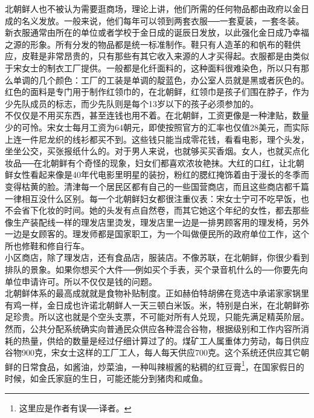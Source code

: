 北朝鲜人也不被认为需要逛商场，理论上讲，他们所需的任何物品都由政府以金日成的名义发放。一般来说，他们每年可以领到两套衣服──一套夏装，一套冬装。新衣服通常由所在的单位或者学校于金日成的诞辰日发放，以此强化金日成乃幸福之源的形象。所有分发的物品都是统一标准制作。鞋只有人造革的和帆布的鞋供应，皮鞋是非常昂贵的，只有那些有其它收入来源的人才买得起。衣服都是由类似于宋女士的制衣工厂提供。一般都是化纤面料的，这种面料很难染色，所以只有那么单调的几个颜色：工厂的工装是单调的靛蓝色，办公室人员就是黑或者灰色的。红色的面料是专门用于制作红领巾的，在北朝鲜，红领巾是孩子们围在脖子，作为少先队成员的标志，而少先队则是每个13岁以下的孩子必须参加的。\\

不仅仅是不用买东西，甚至连钱也用不着。在北朝鲜，工资更像是一种津贴，数量少的可怜。宋女士每月工资为64朝元，即使按照官方的汇率也仅值28美元，而实际上连一件尼龙织的线衫都买不到。这些钱只能当成零花钱，看看电影，理个头发，坐坐公交，买张报纸什么的。对于男人来说，也就够买买香烟。女人，也就买点化妆品──在北朝鲜有个奇怪的现象，妇女们都喜欢浓妆艳抹。大红的口红，让北朝鲜女性看起来像是40年代电影里明星的装扮，粉红的腮红掩饰着由于漫长的冬季而变得枯黄的脸。清津每一个居民区都有自己的一些国营商店，而且这些商店都千篇一律相互没什么区别。每一个北朝鲜妇女都很注重仪表：宋女士宁可不吃早饭，也不会省下化妆的时间。她的头发有点自然卷，而其它她这个年纪的女性，都去那些像生产装配线一样的理发店里烫发，理发店里一边是一排男顾客用的理发椅，另外一边是女顾客的。理发师都是国家职工，为一个叫做便民所的政府单位工作，这个所也修鞋和修自行车。\\

小区商店，除了理发店，还有食品店，服装店。不像苏联，在北朝鲜，你很少看到排队的景象。如果你想买个大件──例如买个手表，买个录音机什么的──你要先向单位申请许可。所以不仅仅是钱的问题。\\

北朝鲜体系的最高成就就是食物补贴制度。正如赫伯特胡佛在竞选中承诺家家锅里有鸡一样，金日成也许诺北朝鲜人一天三顿白米饭。米，特别是白米，在北朝鲜弥足珍贵。所以这也就是个空头支票，不可能对所有人兑现，只能先满足精英阶层。然而，公共分配系统确实向普通民众供应各种混合谷物，根据级别和工作内容所消耗的热量，供给的数量是经过仔细计算过了的。煤矿工人属重体力劳动，每日供应谷物900克，宋女士这样的工厂工人，每人每天供应700克。这个系统还供应其它朝鲜的日常食品，如酱油，炒菜油，一种叫辣椒酱的粘稠的红豆膏\footnote{这里应是作者有误──译者。}，在国家假日的时候，如金氏家庭的生日，可能还能分到猪肉和咸鱼。\\

